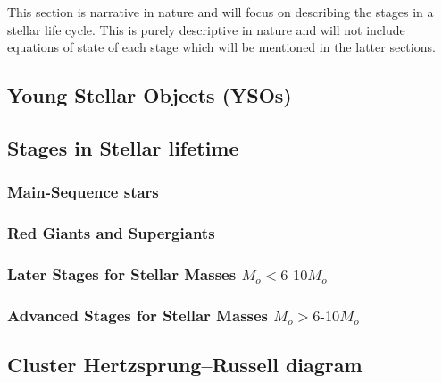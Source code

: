 This section is narrative in nature and will focus on describing the stages in a stellar life cycle. This is purely descriptive in nature and will not include equations of state of each stage which will be mentioned in the latter sections.
\subsection{Young Stellar Objects (YSOs)}

\subsection{Stages in Stellar lifetime}
\subsubsection{Main-Sequence stars}
\subsubsection{Red Giants and Supergiants}
\subsubsection{Later Stages for Stellar Masses $M_o < \text{6-10} M_o$}
\subsubsection{Advanced Stages for Stellar Masses $M_o > \text{6-10} M_o$}
\subsection{Cluster Hertzsprung–Russell diagram}
